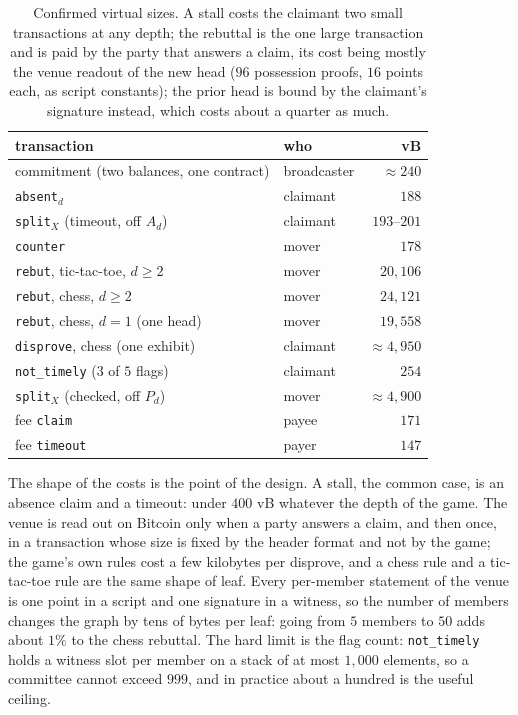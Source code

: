 \documentclass[11pt]{article}
\begin{document}
\begin{table}[t]
\centering
\small
\begin{tabular}{llr}
\toprule
transaction & who & vB \\
\midrule
commitment (two balances, one contract) & broadcaster & $\approx 240$ \\
\texttt{absent}$_d$ & claimant & $188$ \\
\texttt{split}$_X$ (timeout, off $A_d$) & claimant & $193$--$201$ \\
\texttt{counter} & mover & $178$ \\
\texttt{rebut}, tic-tac-toe, $d \ge 2$ & mover & $20{,}106$ \\
\texttt{rebut}, chess, $d \ge 2$ & mover & $24{,}121$ \\
\texttt{rebut}, chess, $d = 1$ (one head) & mover & $19{,}558$ \\
\texttt{disprove}, chess (one exhibit) & claimant & $\approx 4{,}950$ \\
\texttt{not\_timely} ($3$ of $5$ flags) & claimant & $254$ \\
\texttt{split}$_X$ (checked, off $P_d$) & mover & $\approx 4{,}900$ \\
fee \texttt{claim} & payee & $171$ \\
fee \texttt{timeout} & payer & $147$ \\
\bottomrule
\end{tabular}
\caption{Confirmed virtual sizes. A stall costs the claimant two small
transactions at any depth; the rebuttal is the one large transaction
and is paid by the party that answers a claim, its cost being mostly
the venue readout of the new head ($96$ possession proofs, $16$ points
each, as script constants); the prior head is bound by the claimant's
signature instead, which costs about a quarter as much.}
\label{tab:sizes}
\end{table}

The shape of the costs is the point of the design. A stall, the common
case, is an absence claim and a timeout: under $400$ vB whatever the
depth of the game. The venue is read out on Bitcoin only when a party
answers a claim, and then once, in a transaction whose size is fixed by
the header format and not by the game; the game's own rules cost a few
kilobytes per disprove, and a chess rule and a tic-tac-toe rule are
the same shape of leaf. Every per-member statement of the venue is one
point in a script and one signature in a witness, so the number of
members changes the graph by tens of bytes per leaf: going from $5$
members to $50$ adds about $1\%$ to the chess rebuttal. The hard
limit is the flag count: \texttt{not\_timely} holds a witness slot per
member on a stack of at most $1{,}000$ elements, so a committee cannot
exceed $999$, and in practice about a hundred is the useful ceiling.
\end{document}
